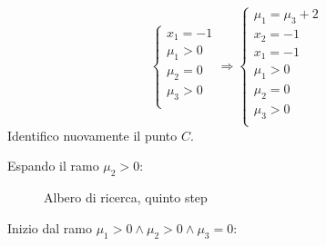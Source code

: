 \documentclass[\main/main.tex]{subfiles}
\begin{document}
\[\begin{cases}
    x_1 = - 1             \\
    \mu_1 > 0             \\
    \mu_2 = 0             \\
    \mu_3 > 0             \\
  \end{cases}
  \Rightarrow
  \begin{cases}
    \mu_1 = \mu_3+2 \\
    x_2 = -1        \\
    x_1 = - 1       \\
    \mu_1 > 0       \\
    \mu_2 = 0       \\
    \mu_3 > 0       \\
  \end{cases}
\]
Identifico nuovamente il punto $C$.

Espando il ramo $\mu_2>0$:

\begin{figure}
  \caption{Albero di ricerca, quinto step}
\end{figure}

Inizio dal ramo $\mu_1 > 0 \land \mu_2>0 \land \mu_3=0$:
\end{document}

